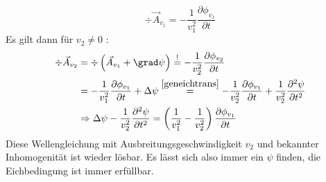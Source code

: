 \begin{equation*}
	\div \vec{{A}}_{{v}_{1}}=-\frac{1}{{v}_{1}^{2}} \frac{\partial \phi_{{v}_{1}}}{\partial {t}}
\end{equation*}
Es gilt dann für ${v}_{2} \neq 0$ :
$$
\begin{aligned}
	 \div \vec{{A}}_{{v}_{2}}&=\div\left(\vec{{A}}_{{v}_{1}}+\grad \psi\right) \stackrel{!}{=}-\frac{1}{{v}_{2}^{2}} \frac{\partial \phi_{{v}_{2}}}{\partial {t}} \\
	& =-\frac{1}{{v}_{1}^{2}} \frac{\partial \phi_{{v}_{1}}}{\partial {t}}+\Delta \psi \stackrel{\ref{geneichtrans}}{=}-\frac{1}{{v}_{2}^{2}} \frac{\partial \phi_{{v}_{1}}}{\partial {t}}+\frac{1}{{v}_{2}^{2}} \frac{\partial^{2} \psi}{\partial {t}^{2}} \\
	& \Rightarrow \Delta \psi-\frac{1}{{v}_{2}^{2}} \frac{\partial^{2} \psi}{\partial {t}^{2}} =\left(\frac{1}{{v}_{1}^{2}}-\frac{1}{{v}_{2}^{2}}\right) \frac{\partial \phi_{{v}_{1}}}{\partial {t}}
\end{aligned}
$$
Diese Wellengleichung mit Ausbreitungsgeschwindigkeit $v_2$ und bekannter Inhomogenität ist wieder lösbar. Es lässt sich also immer ein $\psi$ finden, die Eichbedingung ist immer erfüllbar.

